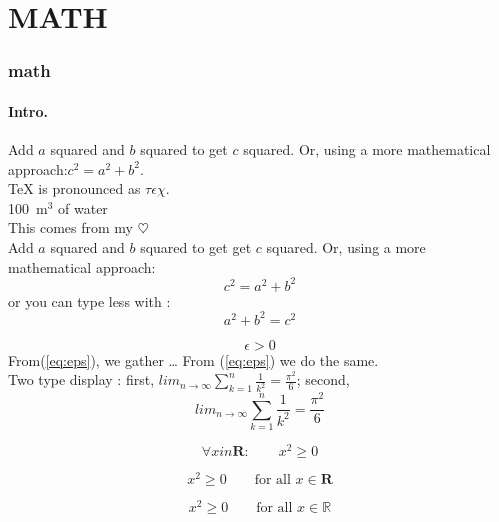 \documentclass[a4paper, 11pt]{article}
\begin{document}
\part{MATH}
\section{math}
\subsection{Intro.}
Add $a$ squared and $b$ squared to get $c$ squared. Or, using a more mathematical approach:$c^2 = a^2 + b^2$.\\

\TeX{} is pronounced as \(\tau\epsilon\chi\). \\[6pt]
100~m$^{3}$ of water\\[6pt]
This comes from my 
\begin{math}
\heartsuit
\end{math}\\

Add $a$ squared and $b$ squared to get get $c$ squared. Or, using a more mathematical approach:
\begin{displaymath}
c^{2} = a^{2} + b^{2}
\end{displaymath}
or you can type less with :
\[a^{2} + b^{2} = c^{2}\] 

\begin{equation}\label{eq:eps}
\epsilon > 0
\end{equation}
From(\ref{eq:eps}), we gather \ldots{} From (\ref{eq:eps}) we do the same.\\
Two type display : first, $lim_{n \to \infty}\sum_{k=1}^{n}\frac{1}{k^2} = \frac{\pi ^{2}}{6}$; second,\begin{displaymath}
lim_{n \to \infty}\sum_{k=1}^{n}\frac{1}{k^2} = \frac{\pi ^{2}}{6}
\end{displaymath}

\begin{equation}
\forall x in \mathbf{R}:
\qquad x^2 \geq 0 
\end{equation}

\begin{equation}
x^2 \geq 0 \qquad
\textrm{for all }x \in \mathbf{R} 
\end{equation}

\begin{displaymath}
x^2 \geq 0 \qquad
\textrm{for all }x \in \mathbb{R}
\end{displaymath}
\end{document}
